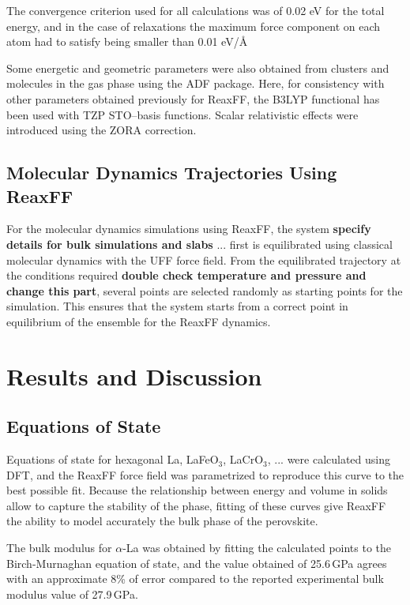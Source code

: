 \documentclass[journal=jpcafh,manuscript=article]{achemso}
\begin{document}
The convergence criterion used for all calculations was of 0.02 eV for the total energy, and in the case of relaxations the maximum force component on each atom had to satisfy being smaller than 0.01 eV/\AA 

Some energetic and geometric parameters were also obtained from clusters and molecules in the gas phase using the ADF package.
Here, for consistency with other parameters obtained previously for ReaxFF, the B3LYP functional has been used with TZP STO--basis functions.
Scalar relativistic effects were introduced using the ZORA correction.

\subsection{Molecular Dynamics Trajectories Using ReaxFF}

For the molecular dynamics simulations using ReaxFF, the system \textbf{specify details for bulk simulations and slabs} ... first is equilibrated using classical molecular dynamics with the UFF force field.
From the equilibrated trajectory at the conditions required \textbf{double check temperature and pressure and change this part}, several points are selected randomly as starting points for the simulation.
This ensures that the system starts from a correct point in equilibrium of the ensemble for the ReaxFF dynamics.

\section{Results and Discussion}

\subsection{Equations of State}

Equations of state for hexagonal La, LaFeO$_3$, LaCrO$_3$, ... were calculated using DFT, and the ReaxFF force field was parametrized to reproduce this curve to the best possible fit.
Because the relationship between energy and volume in solids allow to capture the stability of the phase, fitting of these curves give ReaxFF the ability to model accurately the bulk phase of the perovskite.

The bulk modulus for $\alpha$-La was obtained by fitting the calculated points to the Birch-Murnaghan equation of state\cite{fu_first-principles_1983}, and the value obtained of 25.6\,GPa agrees with an approximate 8\% of error compared to the reported experimental bulk modulus value of 27.9\,GPa.\cite{lide2003crc}
\end{document}
